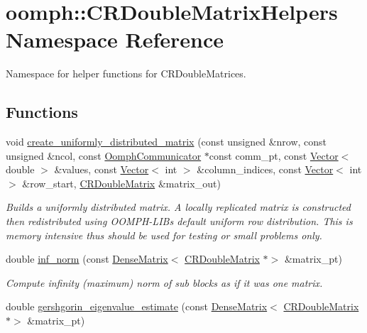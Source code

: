 \hypertarget{namespaceoomph_1_1CRDoubleMatrixHelpers}{}\section{oomph\+:\+:C\+R\+Double\+Matrix\+Helpers Namespace Reference}
\label{namespaceoomph_1_1CRDoubleMatrixHelpers}


Namespace for helper functions for C\+R\+Double\+Matrices.  


\subsection*{Functions}
\begin{DoxyCompactItemize}
\item 
void \hyperlink{namespaceoomph_1_1CRDoubleMatrixHelpers_ae3c10e59d5857457c7e34be8e9262035}{create\+\_\+uniformly\+\_\+distributed\+\_\+matrix} (const unsigned \&nrow, const unsigned \&ncol, const \hyperlink{classoomph_1_1OomphCommunicator}{Oomph\+Communicator} $\ast$const comm\+\_\+pt, const \hyperlink{classoomph_1_1Vector}{Vector}$<$ double $>$ \&values, const \hyperlink{classoomph_1_1Vector}{Vector}$<$ int $>$ \&column\+\_\+indices, const \hyperlink{classoomph_1_1Vector}{Vector}$<$ int $>$ \&row\+\_\+start, \hyperlink{classoomph_1_1CRDoubleMatrix}{C\+R\+Double\+Matrix} \&matrix\+\_\+out)
\begin{DoxyCompactList}\small\item\em Builds a uniformly distributed matrix. A locally replicated matrix is constructed then redistributed using O\+O\+M\+P\+H-\/\+L\+IB\textquotesingle{}s default uniform row distribution. This is memory intensive thus should be used for testing or small problems only. \end{DoxyCompactList}\item 
double \hyperlink{namespaceoomph_1_1CRDoubleMatrixHelpers_ad81583a57fba80fee50d14afdf1c86e2}{inf\+\_\+norm} (const \hyperlink{classoomph_1_1DenseMatrix}{Dense\+Matrix}$<$ \hyperlink{classoomph_1_1CRDoubleMatrix}{C\+R\+Double\+Matrix} $\ast$$>$ \&matrix\+\_\+pt)
\begin{DoxyCompactList}\small\item\em Compute infinity (maximum) norm of sub blocks as if it was one matrix. \end{DoxyCompactList}\item 
double \hyperlink{namespaceoomph_1_1CRDoubleMatrixHelpers_ac7abb3c0163ba84dbf12eb5a0240a59c}{gershgorin\+\_\+eigenvalue\+\_\+estimate} (const \hyperlink{classoomph_1_1DenseMatrix}{Dense\+Matrix}$<$ \hyperlink{classoomph_1_1CRDoubleMatrix}{C\+R\+Double\+Matrix} $\ast$$>$ \&matrix\+\_\+pt)

\end{DoxyCompactItemize}
